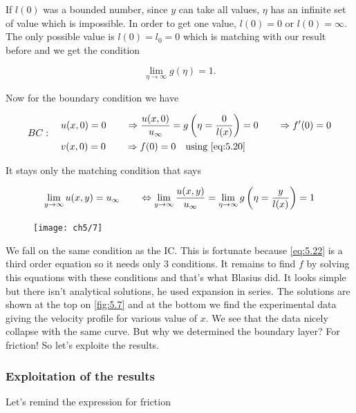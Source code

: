 			If $l(0)$ was a bounded number, since $y$ can take all values, $\eta$ has an infinite set of value which is impossible. In order to get one value, $l(0) = 0$ or $l(0) = \infty$. The only possible value is $l(0) = l_0 = 0$ which is matching with our result before and we get the condition 
			
			\begin{equation}
				\lim _{\eta \rightarrow \infty} g(\eta) = 1.
			\end{equation}
			
			Now for the boundary condition we have 
			
			\begin{equation}
			BC: 	\quad		
			\begin{aligned}
				&u(x,0) = 0 \qquad \Rightarrow \frac{u(x,0)}{u_\infty} = g\left(\eta =\frac{0}{l(x)}\right) = 0 \qquad \Rightarrow f'(0) = 0\\
				&v(x,0) = 0 \qquad \Rightarrow f(0) = 0 \quad \mbox{using } \eqref{eq:5.20}
			\end{aligned}
			\end{equation}
			
			It stays only the matching condition that says 
			
			\begin{equation}
				\lim _{y \rightarrow \infty} u(x,y) = u_\infty \qquad \Leftrightarrow \lim _{y \rightarrow \infty} \frac{u(x,y)}{u_\infty} = \lim _{\eta \rightarrow \infty} g\left( \eta = \frac{y}{l(x)}\right) = 1
			\end{equation}
			
			\begin{figure}
			\vspace{-5mm}
			\texttt{[image: ch5/7]}
			\label{fig:5.7}
			\end{figure}
			We fall on the same condition as the IC. This is fortunate because \eqref{eq:5.22} is a third order equation so it needs only 3 conditions. It remains to find $f$ by solving this equations with these conditions and that's what Blasius did. It looks simple but there isn't analytical solutions, he used expansion in series. The solutions are shown at the top on \autoref{fig:5.7} and at the bottom we find the experimental data giving the velocity profile for various value of $x$. We see that the data nicely collapse with the same curve. But why we determined the boundary layer? For friction! So let's exploite the results.
			
		\subsubsection{Exploitation of the results} 
			Let's remind the expression for friction 
			

